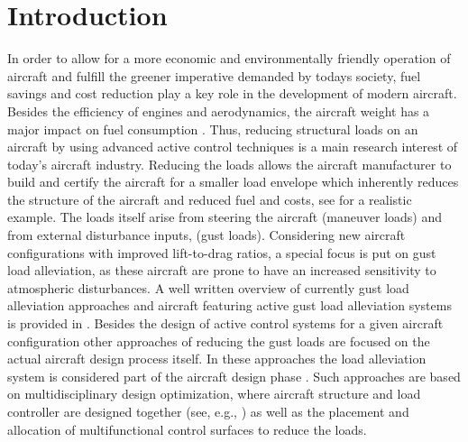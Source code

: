 \documentclass[graybox]{svmult}
\begin{document}



\section{Introduction}

In order to allow for a more economic and environmentally friendly operation of aircraft and fulfill the greener imperative demanded by todays society, fuel savings and cost reduction play a key role in the development of modern aircraft. Besides the efficiency of engines and aerodynamics, the aircraft weight has a major impact on fuel consumption \cite{IEA2009}. 
Thus, reducing structural loads on an aircraft by using advanced active control techniques is a main research interest of today's aircraft industry. Reducing the loads allows the aircraft manufacturer to build and certify \cite{FAA15} the aircraft for a smaller load envelope which inherently reduces the structure of the aircraft and reduced fuel and costs, see \cite{Johnston79} for a realistic example.
The loads itself arise from steering the aircraft (maneuver loads) and from external disturbance inputs, (gust loads). Considering new
aircraft configurations with improved lift-to-drag ratios, a special focus is put on gust load alleviation, as these aircraft are prone to have an increased sensitivity to atmospheric disturbances. A well written overview of currently gust load alleviation approaches and aircraft featuring  active gust load alleviation systems is provided in \cite{Regan12}.
Besides the design of  active control systems for a given aircraft configuration other approaches of reducing the gust loads are focused on the actual aircraft design process itself. In these approaches the load alleviation system is considered part of the aircraft design phase \cite{Livne99}. Such approaches are based on  multidisciplinary design optimization, where aircraft structure and load controller are designed together (see, e.g., \cite{Xu14}) as well as the  placement \cite{Pusch2015} and allocation \cite{Pusch2017} of multifunctional control surfaces to reduce the loads.
\end{document}
